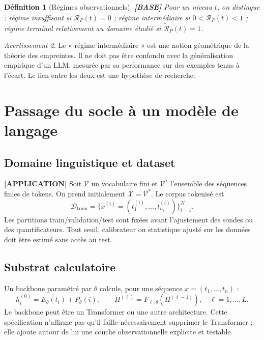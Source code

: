 \documentclass[11pt,a4paper]{article}
\newtheorem{definition}{Définition}[section]
\theoremstyle{remark}
\newtheorem{warning}[definition]{Avertissement}
\newcommand{\X}{\mathcal X}
\newcommand{\D}{\mathcal D}
\newcommand{\V}{\mathcal V}
\begin{document}
\begin{definition}[Régimes observationnels] \textbf{[BASE]}
Pour un niveau $t$, on distingue : régime insuffisant si $\widetilde{\mathcal R}_P(t)=0$ ; régime intermédiaire si $0<\widetilde{\mathcal R}_P(t)<1$ ; régime terminal relativement au domaine étudié si $\widetilde{\mathcal R}_P(t)=1$.
\end{definition}

\begin{warning}
Le « régime intermédiaire » est une notion géométrique de la théorie des empreintes. Il ne doit pas être confondu avec la généralisation empirique d'un LLM, mesurée par sa performance sur des exemples tenus à l'écart. Le lien entre les deux est une hypothèse de recherche.
\end{warning}

\section{Passage du socle à un modèle de langage}

\subsection{Domaine linguistique et dataset}
\textbf{[APPLICATION]} Soit $\V$ un vocabulaire fini et $\V^*$ l'ensemble des séquences finies de tokens. On prend initialement $\X=\V^*$. Le corpus tokenisé est
\[
\D_{\mathrm{train}}=\{x^{(i)}=(t_1^{(i)},\ldots,t_{n_i}^{(i)})\}_{i=1}^N.
\]
Les partitions train/validation/test sont fixées avant l'ajustement des sondes ou des quantificateurs. Tout seuil, calibrateur ou statistique ajusté sur les données doit être estimé sans accès au test.

\subsection{Substrat calculatoire}
Un backbone paramétré par $\theta$ calcule, pour une séquence $x=(t_1,\ldots,t_n)$ :
\[
h_i^{(0)}=E_\theta(t_i)+P_\theta(i),\qquad
H^{(\ell)}=F_{\ell,\theta}(H^{(\ell-1)}),\quad \ell=1,\ldots,L.
\]
Le backbone peut être un Transformer ou une autre architecture. Cette spécification n'affirme pas qu'il faille nécessairement supprimer le Transformer ; elle ajoute autour de lui une couche observationnelle explicite et testable.
\end{document}
